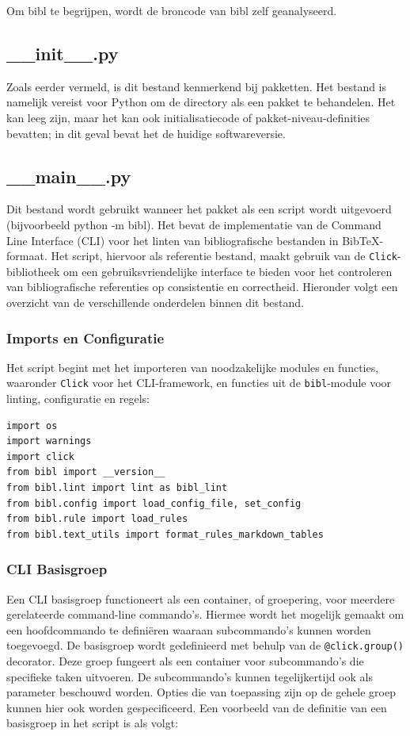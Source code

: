 Om bibl te begrijpen, wordt de broncode van bibl zelf geanalyseerd.

\subsection{\_\_init\_\_.py}
Zoals eerder vermeld, is dit bestand kenmerkend bij pakketten. Het bestand is namelijk vereist voor Python om de directory als een pakket te behandelen. Het kan leeg zijn, maar het kan ook initialisatiecode of pakket-niveau-definities bevatten; in dit geval bevat het de huidige softwareversie.

\subsection{\_\_main\_\_.py}
Dit bestand wordt gebruikt wanneer het pakket als een script wordt uitgevoerd (bijvoorbeeld python -m bibl). Het bevat de implementatie van de Command Line Interface (CLI) voor het linten van bibliografische bestanden in BibTeX-formaat. Het script, hiervoor als referentie bestand, maakt gebruik van de \texttt{Click}-bibliotheek om een gebruiksvriendelijke interface te bieden voor het controleren van bibliografische referenties op consistentie en correctheid. Hieronder volgt een overzicht van de verschillende onderdelen binnen dit bestand.

\subsubsection{Imports en Configuratie}

Het script begint met het importeren van noodzakelijke modules en functies, waaronder \texttt{Click} voor het CLI-framework, en functies uit de \texttt{bibl}-module voor linting, configuratie en regels:

\begin{verbatim}
import os
import warnings
import click
from bibl import __version__
from bibl.lint import lint as bibl_lint
from bibl.config import load_config_file, set_config
from bibl.rule import load_rules
from bibl.text_utils import format_rules_markdown_tables
\end{verbatim}

\subsubsection{CLI Basisgroep}

Een CLI basisgroep functioneert als een container, of groepering, voor meerdere gerelateerde command-line commando's. Hiermee wordt het mogelijk gemaakt om een hoofdcommando te definiëren waaraan subcommando's kunnen worden toegevoegd.
De basisgroep wordt gedefinieerd met behulp van de \texttt{@click.group()} decorator. Deze groep fungeert als een container voor subcommando's die specifieke taken uitvoeren. De subcommando's kunnen tegelijkertijd ook als parameter beschouwd worden. Opties die van toepassing zijn op de gehele groep kunnen hier ook worden gespecificeerd. Een voorbeeld van de definitie van een basisgroep in het script is als volgt:

